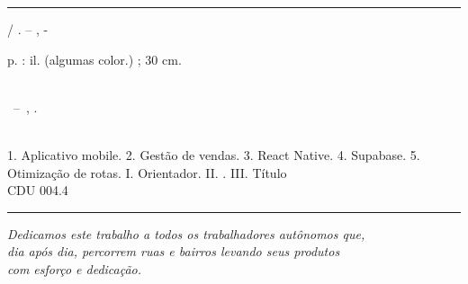 \documentclass[
	12pt,				%
	oneside,			%
	a4paper,			%
	english,			%
	brazil				%
	]{abntex2}
\begin{document}
\frenchspacing


\imprimircapa

\imprimirfolhaderosto*

\begin{fichacatalografica}
	\vspace*{\fill}
	\hrule
	\begin{center}
	\begin{minipage}[c]{12.5cm}

	\imprimirautor

	\hspace{0.5cm} \imprimirtitulo  / \imprimirautor. --
	\imprimirlocal, \imprimirdata-

	\hspace{0.5cm} \pageref{LastPage} p. : il. (algumas color.) ; 30 cm.\\

	\hspace{0.5cm} \imprimirorientadorRotulo~\imprimirorientador\\

	\hspace{0.5cm}
	\parbox[t]{\textwidth}{\imprimirtipotrabalho~--~\imprimirinstituicao,
	\imprimirdata.}\\

	\hspace{0.5cm}
		1. Aplicativo mobile.
		2. Gestão de vendas.
		3. React Native.
		4. Supabase.
		5. Otimização de rotas.
		I. Orientador.
		II. \imprimirinstituicao.
		III. Título\\

	\hspace{8.75cm} CDU 004.4\\

	\end{minipage}
	\end{center}
	\hrule
\end{fichacatalografica}

\begin{dedicatoria}
   \vspace*{\fill}
   \centering
   \noindent
   \textit{Dedicamos este trabalho a todos os trabalhadores autônomos que, \\
   dia após dia, percorrem ruas e bairros levando seus produtos \\
   com esforço e dedicação.} \vspace*{\fill}
\end{dedicatoria}
\end{document}

